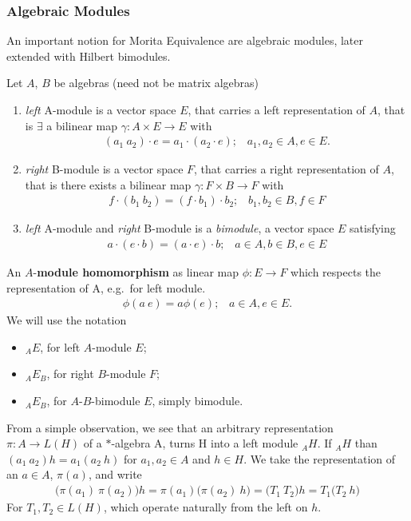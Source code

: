 \subsubsection{Algebraic Modules}
An important notion for Morita Equivalence are algebraic modules, later
extended with Hilbert bimodules.
\begin{definition}
    Let $A$, $B$ be algebras (need not be matrix algebras)
    \begin{enumerate}
        \item \textit{left} A-module is a vector space $E$, that carries a left
            representation of $A$, that is $\exists$ a bilinear map $\gamma: A
            \times E \rightarrow E$ with
            \begin{align}
                (a_1\ a_2)\cdot e = a_1 \cdot (a_2 \cdot e);\;\;\; a_1, a_2 \in
                A, e \in E.
            \end{align}
        \item \textit{right} B-module is a vector space $F$, that carries a
            right representation of $A$, that is there exists a bilinear map
            $\gamma: F \times B \rightarrow F$ with
            \begin{align}
                f \cdot (b_1\ b_2)= (f \cdot b_1) \cdot b_2;\;\;\; b_1, b_2 \in B, f \in F
            \end{align}
        \item \textit{left} A-module and \textit{right} B-module is a
            \textit{bimodule}, a vector space $E$ satisfying
            \begin{align}
                a \cdot (e \cdot b)= (a \cdot e) \cdot b;\;\;\;  a \in A, b \in B, e \in E
            \end{align}
    \end{enumerate}
\end{definition}
An $A$-\textbf{module homomorphism} as linear map $\phi: E\rightarrow F$ which respects the
representation of A, e.g.\ for left module.
\begin{align}
    \phi (a\ e) = a \phi (e); \;\;\; a \in A, e \in E.
\end{align}
We will use the notation
\begin{itemize}
    \item ${}_A E$, for left $A$-module $E$;
    \item ${}_A E_B$, for right $B$-module $F$;
    \item ${}_A E_B$, for $A$-$B$-bimodule $E$, simply bimodule.
\end{itemize}
From a simple observation, we see that an arbitrary representation $\pi : A
\rightarrow L(H)$ of a $*$-algebra A, turns H into a left module ${}_A H$.  If
$_A H$ than $(a_1\ a_2) h = a_1 (a_2\ h)$ for $a_1, a_2 \in A$ and $h \in H$. We
take the representation of an $a \in A$, $\pi (a)$, and write
\begin{align}
    \big(\pi(a_1)\ \pi(a_2)\big)h = \pi(a_1)\big(\pi(a_2)\ h\big) =
    \big(T_1\ T_2\big) h = T_1 \big(T_2\ h\big)
\end{align}
For $T_1, T_2 \in L(H)$, which operate naturally from the left on $h$.

